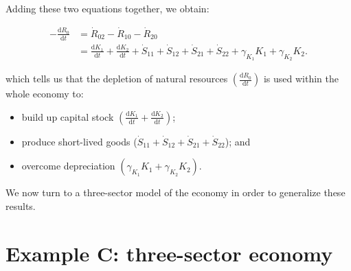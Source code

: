 Adding these two equations together,
we obtain:

\begin{align} 
	- \frac{\mathrm{d}R_{0}}{\mathrm{d}t}			&
	= \dot{R}_{02}
	- \dot{R}_{10}
	- \dot{R}_{20}									\nonumber	\\
\label{eq:B_CV_1and2}											&
	= \frac{\mathrm{d}K_{1}}{\mathrm{d}t}
	+ \frac{\mathrm{d}K_{2}}{\mathrm{d}t}
	+ \dot{S}_{11}
	+ \dot{S}_{12} 
	+ \dot{S}_{21}
	+ \dot{S}_{22}
	+ \gamma_{K_{1}}K_{1}
	+ \gamma_{K_{2}}K_{2}.
\end{align}

\noindent{}which tells us that
the depletion of natural resources
$\left(\frac{\mathrm{d}R_{0}}{\mathrm{d}t}\right)$
is used within the whole economy to:

\begin{itemize}
	\item{build up capital stock
	$\left(\frac{\mathrm{d}K_{1}}{\mathrm{d}t}
	+ \frac{\mathrm{d}K_{2}}{\mathrm{d}t}\right)$;}
	\item{produce short-lived goods
	($\dot{S}_{11}
	+ \dot{S}_{12} 
	+ \dot{S}_{21}
	+ \dot{S}_{22}$); and}
	\item{overcome depreciation
	$\left(\gamma_{K_{1}}K_{1}
	+ \gamma_{K_{2}}K_{2}\right)$.}
\end{itemize}

We now turn to a three-sector model of the economy
in order to generalize these results.

%
%

\section{Example C: three-sector economy} %
\label{sec:C_materials}

